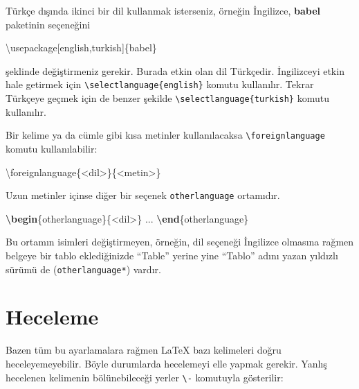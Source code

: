 \documentclass[
  10pt,
]{scrbook}
\newenvironment{Shaded}{}{}
\newcommand{\BuiltInTok}[1]{#1}
\newcommand{\ExtensionTok}[1]{#1}
\newcommand{\FunctionTok}[1]{\textcolor[rgb]{0.02,0.16,0.49}{#1}}
\newcommand{\KeywordTok}[1]{\textcolor[rgb]{0.00,0.44,0.13}{\textbf{#1}}}
\newcommand{\NormalTok}[1]{#1}
\theoremstyle{definition}
\theoremstyle{definition}
\theoremstyle{definition}
\theoremstyle{definition}
\theoremstyle{remark}
\begin{document}
Türkçe dışında ikinci bir dil kullanmak isterseniz, örneğin İngilizce, \textbf{babel} paketinin seçeneğini

\begin{Shaded}
\begin{Highlighting}[]
\BuiltInTok{\textbackslash{}usepackage}\NormalTok{[english,turkish]\{}\ExtensionTok{babel}\NormalTok{\}}
\end{Highlighting}
\end{Shaded}

şeklinde değiştirmeniz gerekir. Burada etkin olan dil Türkçedir. İngilizceyi etkin hale getirmek için \texttt{\textbackslash{}selectlanguage\{english\}} komutu kullanılır. Tekrar Türkçeye geçmek için de benzer şekilde \texttt{\textbackslash{}selectlanguage\{turkish\}} komutu kullanılır.

Bir kelime ya da cümle gibi kısa metinler kullanılacaksa \texttt{\textbackslash{}foreignlanguage} komutu kullanılabilir:

\begin{Shaded}
\begin{Highlighting}[]
\FunctionTok{\textbackslash{}foreignlanguage}\NormalTok{\{\textless{}dil\textgreater{}\}\{\textless{}metin\textgreater{}\}}
\end{Highlighting}
\end{Shaded}

Uzun metinler içinse diğer bir seçenek \texttt{otherlanguage} ortamıdır.

\begin{Shaded}
\begin{Highlighting}[]
\KeywordTok{\textbackslash{}begin}\NormalTok{\{}\ExtensionTok{otherlanguage}\NormalTok{\}\{\textless{}dil\textgreater{}\}}
\NormalTok{  ...}
\KeywordTok{\textbackslash{}end}\NormalTok{\{}\ExtensionTok{otherlanguage}\NormalTok{\}}
\end{Highlighting}
\end{Shaded}

Bu ortamın isimleri değiştirmeyen, örneğin, dil seçeneği İngilizce olmasına rağmen belgeye bir tablo eklediğinizde ``Table'' yerine yine ``Tablo'' adını yazan yıldızlı sürümü de (\texttt{otherlanguage*}) vardır.

\hypertarget{heceleme}{%
\section{Heceleme}\label{heceleme}}

Bazen tüm bu ayarlamalara rağmen LaTeX bazı kelimeleri doğru heceleyemeyebilir. Böyle durumlarda hecelemeyi elle yapmak gerekir. Yanlış hecelenen kelimenin bölünebileceği yerler \texttt{\textbackslash{}-} komutuyla gösterilir:
\end{document}
